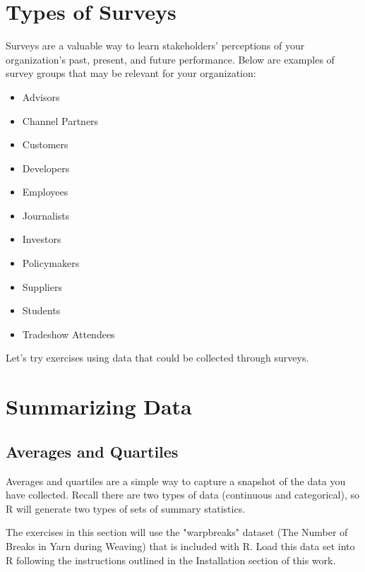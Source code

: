 %
%
%
%
%

\section{Types of Surveys}
Surveys are a valuable way to learn stakeholders' perceptions of your organization's past, present, and future performance. Below are examples of survey groups that may be relevant for your organization:

\begin{itemize}
 \item Advisors
 \item Channel Partners
 \item Customers
 \item Developers
 \item Employees
 \item Journalists
 \item Investors
 \item Policymakers
 \item Suppliers
 \item Students
 \item Tradeshow Attendees
\end{itemize}

Let's try exercises using data that could be collected through surveys.

\section{Summarizing Data}

\subsection{Averages and Quartiles}
Averages and quartiles are a simple way to capture a snapshot of the data you have collected. Recall there are two types of data (continuous and categorical), so R will generate two types of sets of summary statistics.

The exercises in this section will use the "warpbreaks" dataset (The Number of Breaks in Yarn during Weaving) that is included with R. Load this data set into R following the instructions outlined in the Installation section of this work.



